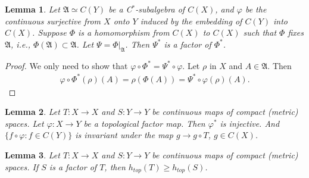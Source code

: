 \documentclass[a4paper,10pt]{amsart}
\newtheorem{lemma}{Lemma}[section]
\newcommand{\AAA}{\mathfrak A}
\begin{document}
\begin{lemma} \label{w_lem1}
    Let $\AAA \simeq C(Y)$ be a C$^*$-subalgebra of $C(X)$,
    and $\varphi$ be the continuous surjective from $X$ onto
    $Y$ induced by the embedding of $C(Y)$ into $C(X)$. 
    Suppose $\varPhi$ is a homomorphism from $C(X)$ to $C(X)$ 
    such that $\varPhi$ fixes $\AAA$, i.e., $\varPhi(\AAA) \subset \AAA$.
    Let $\varPsi = \varPhi|_{\AAA}$. Then 
    $\varPsi^{*}$ is a factor of $\varPhi^{*}$.
\end{lemma}

\begin{proof}
    We only need to show that $\varphi \circ \varPhi^{*} 
    = \varPsi^{*} \circ \varphi$. 
   Let $\rho$ in $X$ and $A \in \AAA$. Then
   \begin{align*}
    \varphi \circ \varPhi^{*}(\rho)(A) = \rho(\varPhi(A))
    = \varPsi^{*}\circ \varphi (\rho)(A).
   \end{align*}
\end{proof}

\begin{lemma} \label{w_lam2}
Let $T: X \rightarrow X$ and $S:Y \rightarrow Y$ be continuous maps
of compact (metric) spaces. Let $\varphi: X \rightarrow Y$ be a 
topological factor map. Then $\varphi^{*}$ is injective. And 
$\{f \circ \varphi : f \in C(Y) \}$ is invariant under the map
$g \rightarrow g \circ T$, $g \in C(X)$.
\end{lemma}

\begin{lemma} \label{w_lam3}
Let $T: X \rightarrow X$ and $S:Y \rightarrow Y$ be continuous maps
of compact (metric) spaces. If $S$ is a factor of $T$, then
$h_{top}(T) \geq h_{top}(S)$.
\end{lemma}
\end{document}
